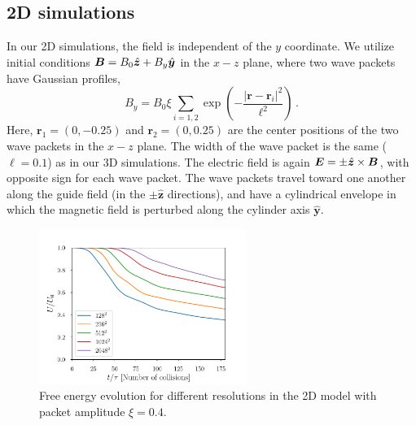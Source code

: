 \subsection{2D simulations}
%
In our 2D simulations, the field is independent of the $y$ coordinate.
We utilize initial conditions
%
$\boldsymbol{B} = B_0\hat{\boldsymbol{z}}+ B_y\hat{\boldsymbol{y}}$ in the $x-z$ plane, where two \alfven wave packets have Gaussian profiles,
%
\begin{equation}
\label{eqn:2d-wave-packets}
	B_y =B_0 \xi \sum\limits_{i=1,2} \exp\left(- \frac{|\boldsymbol{r}-\boldsymbol{r}_i|^2}{\ell^2} \right) \, .
\end{equation}
%
Here, $\boldsymbol{r}_1 = (0,-0.25)$ and $\boldsymbol{r}_2 = (0,0.25)$ are the center positions of the two wave packets in the $x-z$ plane.
The width of the wave packet is the same ($\ell=0.1$) as in our 3D simulations.
The electric field is again $\boldsymbol{E} = \pm \hat{\boldsymbol{z}}\times \boldsymbol{B}$, with opposite sign for each wave packet. The wave packets travel toward one another along the guide field (in the $\pm \hat{\boldsymbol{z}}$ directions), and have a cylindrical envelope in which the magnetic field is perturbed along the cylinder axis $\hat {\boldsymbol{y}}$. 
%
\begin{figure}[h]
\centering
\includegraphics[width=0.6\textwidth]{pics/chap4/convergence2D}
\caption[Free energy evolution for different resolutions in the 2D model]{ Free energy evolution for different resolutions in the 2D model with packet amplitude $\xi=0.4$.}
\label{energy2D}
\end{figure}
%


